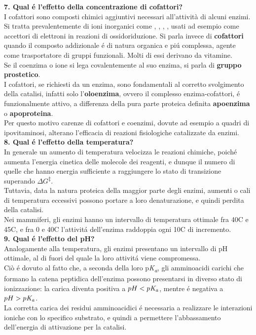 \documentclass[a4paper,12pt]{article}
\begin{document}
\textbf{7. Qual \'e l'effetto della concentrazione di cofattori?}\\

I cofattori sono composti chimici aggiuntivi necessari all'attivit\`a di alcuni enzimi. Si tratta prevalentemente di ioni inorganici come , , , , usati ad esempio come accettori di elettroni in reazioni di ossidoriduzione. Si parla invece di \textbf{cofattori} quando il composto addizionale \'e di natura organica e pi\'u complessa, agente come trasportatore di gruppi funzionali. Molti di essi derivano da vitamine.\\
Se il coenzima o ione si lega covalentemente al suo enzima, si parla di \textbf{gruppo prostetico}.\\
I cofattori, se richiesti da un enzima, sono fondamentali al corretto svolgimento della catalisi, infatti solo l'\textbf{oloenzima}, ovvero il complesso enzima-cofattori, \'e funzionalmente attivo, a differenza della pura parte proteica definita \textbf{apoenzima} o \textbf{apoproteina}.\\
Per questo motivo carenze di cofattori e coenzimi, dovute ad esempio a quadri di ipovitaminosi, alterano l'efficacia di reazioni fisiologiche catalizzate da enzimi.\\

\textbf{8. Qual \'e l'effetto della temperatura?}\\

In generale un aumento di temperatura velocizza le reazioni chimiche, poich\'e aumenta l'energia cinetica delle molecole dei reagenti, e dunque il numero di quelle che hanno energia sufficiente a raggiungere lo stato di transizione superando \textit{$\Delta G$\textsuperscript{$\ddagger$}}.\\
Tuttavia, data la natura proteica della maggior parte degli enzimi, aumenti o cali di temperatura eccessivi possono portare a loro denaturazione, e quindi perdita della catalisi.\\
Nei mammiferi, gli enzimi hanno un intervallo di temperatura ottimale fra 40\degree C e 45\degree C, e fra 0 e 40\degree C l'attivit\'a dell'enzima raddoppia ogni 10\degree C di incremento.\\

\textbf{9. Qual \'e l'effetto del pH?}\\

Analogamente alla temperatura, gli enzimi presentano un intervallo di pH ottimale, al di fuori del quale la loro attivit\'a viene compromessa.\\
Ci\`o \'e dovuto al fatto che, a seconda della loro p\textit{K\textsubscript{a}}, gli amminoacidi carichi che formano la catena peptidica dell'enzima possono presentarsi in diverso stato di ionizzazione: la carica diventa positiva a $pH < p\textit{K\textsubscript{a}}$, mentre \'e negativa a $pH > p\textit{K\textsubscript{a}}$.\\
La corretta carica dei residui amminoacidici \'e necessaria a realizzare le interazioni ioniche con lo specifico substrato, e quindi a permettere l'abbassamento dell'energia di attivazione per la catalisi.\\
\end{document}
